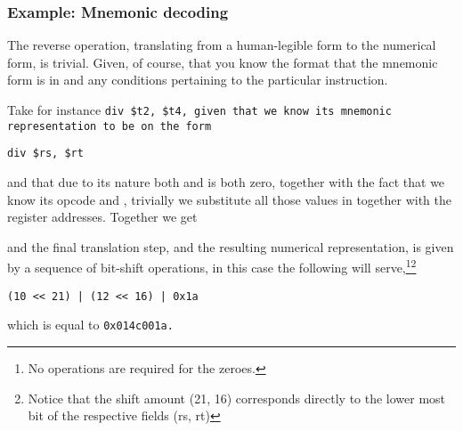 \subsubsection{Example: Mnemonic decoding}

The reverse operation, translating from a human-legible form to the
numerical form, is trivial. Given, of course, that you know the format
that the mnemonic form is in and any conditions pertaining to the
particular instruction. 

Take for instance \tt{div \$t2, \$t4}, given that we know its mnemonic
representation to be on the form

\begin{lstlisting}[style=mips_lst]
div $rs, $rt
\end{lstlisting}

and that due to its nature both \shamt{} and \rd{} is both zero,
together with the fact that we know its opcode and \funct{}, trivially
we substitute all those values in together with the register
addresses. Together we get

\begin{figure}[H]
\end{figure}

and the final translation step, and the resulting numerical
representation, is given by a sequence of bit-shift operations, in
this case the following will serve,\footnote{No operations are
  required for the zeroes.}\footnote{Notice that the shift amount (21,
  16) corresponds directly to the lower most bit of the respective fields (rs, rt)}

\begin{lstlisting}
(10 << 21) | (12 << 16) | 0x1a
\end{lstlisting}

which is equal to \tt{0x014c001a}.
